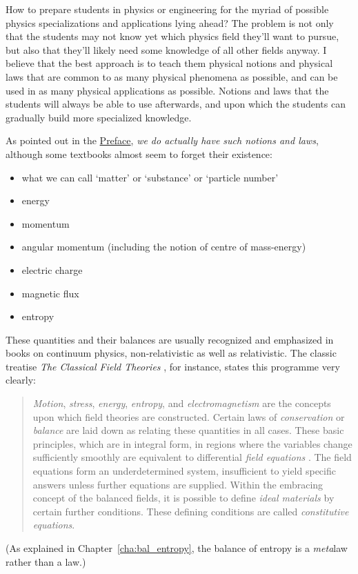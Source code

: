\documentclass[a4paper,12pt,%
onecolumn,oneside,%
british%
]{memoir}
\renewcommand*{\|}[1][]{\nonscript\:#1\vert\nonscript\:\mathopen{}}
\newcommand*{\chap}{Chapter}%
\newcommand*{\masse}{mass-energy}
\begin{document}
How to prepare students in  physics or engineering for the myriad of possible physics specializations and applications lying ahead? The problem is not only that the students may not know yet which physics field they'll want to pursue, but also that they'll likely need some knowledge of all other fields anyway. I believe that the best approach is to teach them physical notions and physical laws that are common to as many physical phenomena as possible, and can be used in as many physical applications as possible. Notions and laws that the students will always be able to use afterwards, and upon which the students can gradually build more specialized knowledge.

As pointed out in the \hyperref[cha:preface]{Preface}, \emph{we do actually have such notions and laws}, although some textbooks almost seem to forget their existence:
\begin{itemize}[nosep]
\item what we can call \enquote*{matter} or \enquote*{substance} or \enquote*{particle number}
\item energy
\item momentum
\item angular momentum (including the notion of centre of \masse)
\item electric charge
\item magnetic flux
\item entropy
\end{itemize}
These quantities and their balances are usually recognized and emphasized in books on continuum physics, non-relativistic as well as relativistic. The classic treatise \emph{The Classical Field Theories} \parencites*{truesdelletal1960}, for instance, states this programme very clearly:
\begin{quote}
  \emph{Motion}, \emph{stress}, \emph{energy}, \emph{entropy}, and \emph{electromagnetism} are the concepts upon which field theories are constructed. Certain laws of \emph{conservation} or \emph{balance} are laid down as relating these quantities in all cases. These basic principles, which are in integral form, in regions where the variables change sufficiently smoothly are equivalent to differential \emph{field equations} \textelp{}. The field equations \textelp{} form an underdetermined system, insufficient to yield specific answers unless further equations are supplied. Within the embracing concept of the balanced fields, it is possible to define \emph{ideal materials} by certain further conditions. These defining conditions are called \emph{constitutive equations}.
\end{quote}
(As explained in \chap~\ref{cha:bal_entropy}, the balance of entropy is a \emph{meta}law rather than a law.)
\end{document}
